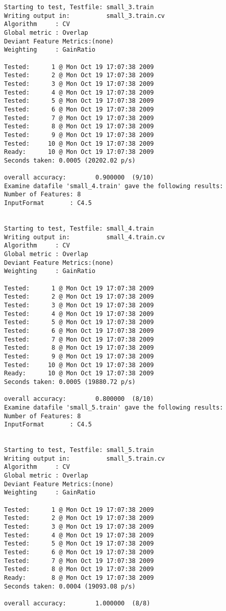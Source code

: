 \documentclass{report}
\begin{document}
\begin{footnotesize}
\begin{verbatim}
Starting to test, Testfile: small_3.train
Writing output in:          small_3.train.cv
Algorithm     : CV
Global metric : Overlap
Deviant Feature Metrics:(none)
Weighting     : GainRatio

Tested:      1 @ Mon Oct 19 17:07:38 2009
Tested:      2 @ Mon Oct 19 17:07:38 2009
Tested:      3 @ Mon Oct 19 17:07:38 2009
Tested:      4 @ Mon Oct 19 17:07:38 2009
Tested:      5 @ Mon Oct 19 17:07:38 2009
Tested:      6 @ Mon Oct 19 17:07:38 2009
Tested:      7 @ Mon Oct 19 17:07:38 2009
Tested:      8 @ Mon Oct 19 17:07:38 2009
Tested:      9 @ Mon Oct 19 17:07:38 2009
Tested:     10 @ Mon Oct 19 17:07:38 2009
Ready:      10 @ Mon Oct 19 17:07:38 2009
Seconds taken: 0.0005 (20202.02 p/s)

overall accuracy:        0.900000  (9/10)
Examine datafile 'small_4.train' gave the following results:
Number of Features: 8
InputFormat       : C4.5


Starting to test, Testfile: small_4.train
Writing output in:          small_4.train.cv
Algorithm     : CV
Global metric : Overlap
Deviant Feature Metrics:(none)
Weighting     : GainRatio

Tested:      1 @ Mon Oct 19 17:07:38 2009
Tested:      2 @ Mon Oct 19 17:07:38 2009
Tested:      3 @ Mon Oct 19 17:07:38 2009
Tested:      4 @ Mon Oct 19 17:07:38 2009
Tested:      5 @ Mon Oct 19 17:07:38 2009
Tested:      6 @ Mon Oct 19 17:07:38 2009
Tested:      7 @ Mon Oct 19 17:07:38 2009
Tested:      8 @ Mon Oct 19 17:07:38 2009
Tested:      9 @ Mon Oct 19 17:07:38 2009
Tested:     10 @ Mon Oct 19 17:07:38 2009
Ready:      10 @ Mon Oct 19 17:07:38 2009
Seconds taken: 0.0005 (19880.72 p/s)

overall accuracy:        0.800000  (8/10)
Examine datafile 'small_5.train' gave the following results:
Number of Features: 8
InputFormat       : C4.5


Starting to test, Testfile: small_5.train
Writing output in:          small_5.train.cv
Algorithm     : CV
Global metric : Overlap
Deviant Feature Metrics:(none)
Weighting     : GainRatio

Tested:      1 @ Mon Oct 19 17:07:38 2009
Tested:      2 @ Mon Oct 19 17:07:38 2009
Tested:      3 @ Mon Oct 19 17:07:38 2009
Tested:      4 @ Mon Oct 19 17:07:38 2009
Tested:      5 @ Mon Oct 19 17:07:38 2009
Tested:      6 @ Mon Oct 19 17:07:38 2009
Tested:      7 @ Mon Oct 19 17:07:38 2009
Tested:      8 @ Mon Oct 19 17:07:38 2009
Ready:       8 @ Mon Oct 19 17:07:38 2009
Seconds taken: 0.0004 (19093.08 p/s)

overall accuracy:        1.000000  (8/8)
\end{verbatim}
\end{footnotesize}
\end{document}
